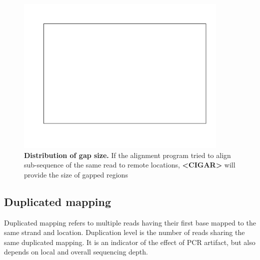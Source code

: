 \documentclass{article}
\begin{document}
\begin{center}
\begin{figure}
\includegraphics[width=4in, height=3in]{bamchop-gap-size}
\caption{\textbf{Distribution of gap size.} If the alignment program tried to align sub-sequence of the same read to remote locations, \textbf{<CIGAR>} will provide the size of gapped regions}
\end{figure}
\end{center}


\subsection{Duplicated mapping}
Duplicated mapping refers to multiple reads having their first base mapped to the same strand and location. Duplication level is the number of reads sharing the same duplicated mapping. It is an indicator of the effect of PCR artifact, but also depends on local and overall sequencing depth.
\end{document}
